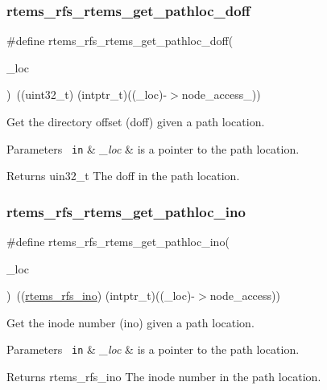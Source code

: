 \subsubsection{\texorpdfstring{rtems\_rfs\_rtems\_get\_pathloc\_doff}{rtems\_rfs\_rtems\_get\_pathloc\_doff}}
{\footnotesize\ttfamily \#define rtems\+\_\+rfs\+\_\+rtems\+\_\+get\+\_\+pathloc\+\_\+doff(\begin{DoxyParamCaption}\item[{}]{\+\_\+loc }\end{DoxyParamCaption})~((uint32\+\_\+t) (intptr\+\_\+t)((\+\_\+loc)-\/$>$node\+\_\+access\+\_))}

Get the directory offset (doff) given a path location.


\begin{DoxyParams}[1]{Parameters}
\mbox{\texttt{ in}}  & {\em \+\_\+loc} & is a pointer to the path location. \\
\hline
\end{DoxyParams}
\begin{DoxyReturn}{Returns}
uin32\+\_\+t The doff in the path location. 
\end{DoxyReturn}
\mbox{\label{rtems-rfs-rtems_8h_a1a189ed32eb8a8b93d75218f184e8815}} 
\subsubsection{\texorpdfstring{rtems\_rfs\_rtems\_get\_pathloc\_ino}{rtems\_rfs\_rtems\_get\_pathloc\_ino}}
{\footnotesize\ttfamily \#define rtems\+\_\+rfs\+\_\+rtems\+\_\+get\+\_\+pathloc\+\_\+ino(\begin{DoxyParamCaption}\item[{}]{\+\_\+loc }\end{DoxyParamCaption})~((\mbox{\hyperlink{rtems-rfs-inode_8h_ae658325c3ff9941f2e68315d20e3c723}{rtems\+\_\+rfs\+\_\+ino}}) (intptr\+\_\+t)((\+\_\+loc)-\/$>$node\+\_\+access))}

Get the inode number (ino) given a path location.


\begin{DoxyParams}[1]{Parameters}
\mbox{\texttt{ in}}  & {\em \+\_\+loc} & is a pointer to the path location. \\
\hline
\end{DoxyParams}
\begin{DoxyReturn}{Returns}
rtems\+\_\+rfs\+\_\+ino The inode number in the path location. 
\end{DoxyReturn}
\mbox{\label{rtems-rfs-rtems_8h_af2fd1c5f777c0554c38daa3dfce108a6}} 
